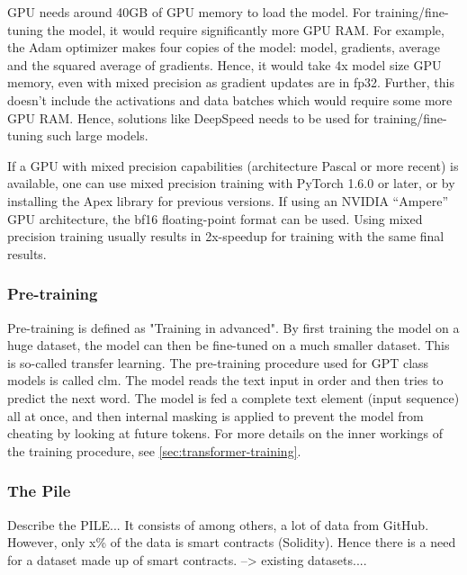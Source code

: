 GPU needs around 40GB of GPU memory to load the model. For training/fine-tuning the model, it would require significantly more GPU RAM. For example, the Adam optimizer makes four copies of the model: model, gradients, average and the squared average of gradients. Hence, it would take 4x model size GPU memory, even with mixed precision as gradient updates are in fp32. Further, this doesn't include the activations and data batches which would require some more GPU RAM. Hence, solutions like DeepSpeed needs to be used for training/fine-tuning such large models.

If a GPU with mixed precision capabilities (architecture Pascal or more recent) is available, one can use mixed precision training with PyTorch 1.6.0 or later, or by installing the Apex library for previous versions. If using an NVIDIA “Ampere” GPU architecture, the \acrfull{bf16} floating-point format can be used. Using mixed precision training usually results in 2x-speedup for training with the same final results.

\subsubsection{Pre-training}
Pre-training is defined as "Training in advanced". By first training the model on a huge dataset, the model can then be fine-tuned on a much smaller dataset. This is so-called transfer learning. The pre-training procedure used for GPT class models is called \acrshort{clm}. The model reads the text input in order and then tries to predict the next word. The model is fed a complete text element (input sequence) all at once, and then internal masking is applied to prevent the model from cheating by looking at future tokens. For more details on the inner workings of the training procedure, see \cref{sec:transformer-training}.

\subsubsection{The Pile}
\label{sec:the-pile}
Describe the  PILE...  It consists of among others, a lot of data from GitHub. However, only x\% of the data is smart contracts (Solidity). Hence there is a need for a dataset made up of smart contracts. --> existing datasets....


